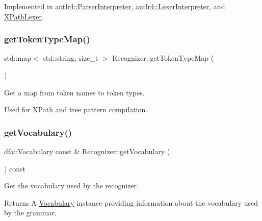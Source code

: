 Implemented in \hyperlink{classantlr4_1_1ParserInterpreter_a8aaa489bc12ef24e3808ecfc41609869}{antlr4\+::\+Parser\+Interpreter}, \hyperlink{classantlr4_1_1LexerInterpreter_a09dd1700a39365debf06b10af7d34da6}{antlr4\+::\+Lexer\+Interpreter}, and \hyperlink{classXPathLexer_a6d2373c466f6a3d92ced0a2d79380a0d}{X\+Path\+Lexer}.

\mbox{\label{classantlr4_1_1Recognizer_a44e911d62132ccc76375b6c28bc340d5}} 
\subsubsection{\texorpdfstring{get\+Token\+Type\+Map()}{getTokenTypeMap()}}
{\footnotesize\ttfamily std\+::map$<$ std\+::string, size\+\_\+t $>$ Recognizer\+::get\+Token\+Type\+Map (\begin{DoxyParamCaption}{ }\end{DoxyParamCaption})\hspace{0.3cm}{\ttfamily [virtual]}}



Get a map from token names to token types. 

Used for X\+Path and tree pattern compilation. 

\mbox{\label{classantlr4_1_1Recognizer_aae7ec953d3f35749e62ccb96fa3e0946}} 
\subsubsection{\texorpdfstring{get\+Vocabulary()}{getVocabulary()}}
{\footnotesize\ttfamily dfa\+::\+Vocabulary const  \& Recognizer\+::get\+Vocabulary (\begin{DoxyParamCaption}{ }\end{DoxyParamCaption}) const\hspace{0.3cm}{\ttfamily [virtual]}}

Get the vocabulary used by the recognizer.

\begin{DoxyReturn}{Returns}
A \hyperlink{}{Vocabulary} instance providing information about the vocabulary used by the grammar. 
\end{DoxyReturn}


